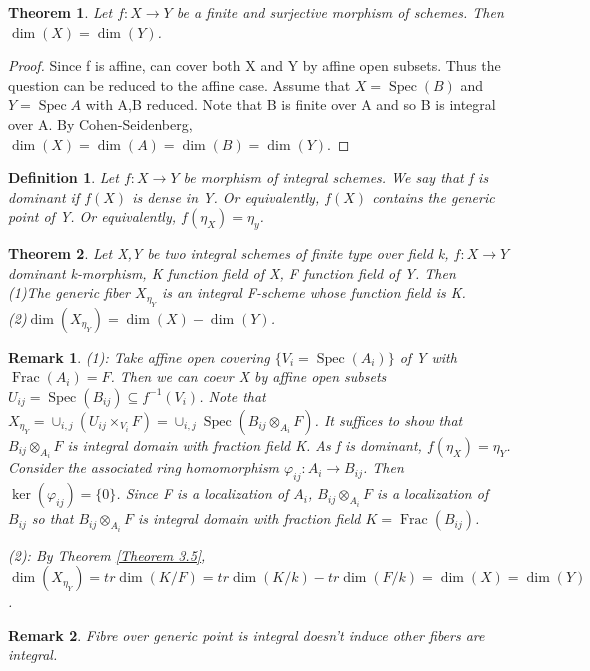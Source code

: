 \documentclass{ctexart}
\newtheorem{definition}{Definition}[section]
\newtheorem{remark}{Remark}[section]
\newtheorem{theorem}{Theorem}[section]
\newcommand{\spec}{\operatorname{Spec}}
\newcommand{\fraction}{\operatorname{Frac}}
\begin{document}
\begin{theorem}
    Let $f: X \longrightarrow Y$ be a finite and surjective morphism of schemes.
    Then $\dim(X) = \dim(Y)$.
    \label{Theorem 3.7}
\end{theorem}
\begin{proof}
    Since f is affine, can cover both X and Y by affine open subsets.
    Thus the question can be reduced to the affine case.
    Assume that $X = \spec(B)$ and $Y = \spec A$ with A,B reduced.
    Note that B is finite over A and so B is integral over A.
    By Cohen-Seidenberg, $\dim(X) = \dim(A) = \dim(B) = \dim(Y)$.
\end{proof}
\begin{definition}
    Let $f: X \longrightarrow Y$ be morphism of integral schemes.
    We say that f is dominant if $f(X)$ is dense in Y.
    Or equivalently, $f(X)$ contains the generic point of Y.
    Or equivalently, $f(\eta_{X}) = \eta_{y}$.
\end{definition}
\begin{theorem}
    Let X,Y be two integral schemes of finite type over field k, $f: X \longrightarrow Y$ dominant k-morphism, K function field of X, F function field of Y.
    Then \\
    (1)The generic fiber $X_{\eta_{Y}}$ is an integral F-scheme whose function field is K. \\
    (2)$\dim(X_{\eta_{Y}}) = \dim(X) - \dim(Y)$. 
    \label{Theorem 3.8}
\end{theorem}
\begin{remark}
    (1): Take affine open covering $\{V_{i} = \spec(A_{i})\}$ of Y with $\fraction(A_{i}) = F$.
    Then we can coevr X by affine open subsets $U_{ij} = \spec(B_{ij}) \subseteq f^{-1}(V_{i})$.
    Note that $X_{\eta_{Y}} = \cup_{i,j} (U_{ij} \times_{V_{i}} F) = \cup_{i,j} \spec(B_{ij} \otimes_{A_{i}} F)$.
    It suffices to show that $B_{ij} \otimes_{A_{i}} F$ is integral domain with fraction field K.
    As f is dominant, $f(\eta_{X}) = \eta_{Y}$.
    Consider the associated ring homomorphism $\varphi_{ij}: A_{i} \longrightarrow B_{ij}$.
    Then $\ker(\varphi_{ij}) = \{0\}$.
    Since F is a localization of $A_{i}$, $B_{ij} \otimes_{A_{i}} F$ is a localization of $B_{ij}$ so that $B_{ij} \otimes_{A_{i}} F$ is integral domain with fraction field $K = \fraction(B_{ij})$.
    \par
    (2): By Theorem \ref{Theorem 3.5}, $\dim(X_{\eta_{Y}}) = tr\dim(K/F) = tr\dim(K/k) - tr\dim(F/k) = \dim(X) = \dim(Y)$.
\end{remark}
\begin{remark}
    Fibre over generic point is integral doesn't induce other fibers are integral.
\end{remark}
\end{document}
